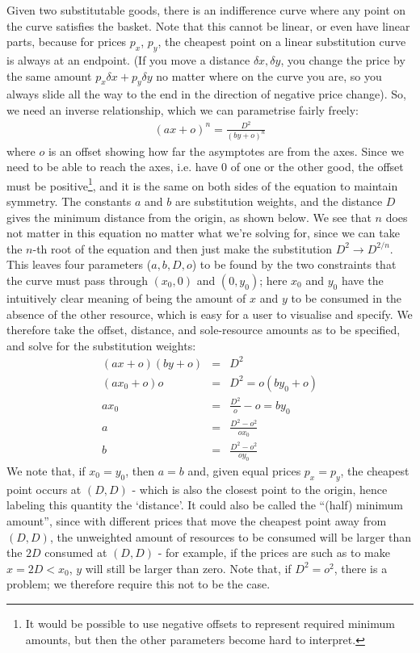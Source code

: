 \documentclass[12pt]{book}
\begin{document}
Given two substitutable goods, there is an indifference curve where
any point on the curve satisfies the basket. Note that this cannot be
linear, or even have linear parts, because for prices $p_x$, $p_y$,
the cheapest point on a linear substitution curve is always at an
endpoint. (If you move a distance $\delta x, \delta y$, you change the
price by the same amount $p_x\delta x + p_y \delta y$ no matter where
on the curve you are, so you always slide all the way to the end in
the direction of negative price change). So, we need an inverse
relationship, which we can parametrise fairly freely:
\begin{eqnarray}
(ax + o)^n = \frac{D^2}{(by + o)^n}
\end{eqnarray}
where $o$ is an offset showing how far the asymptotes are from the
axes. Since we need to be able to reach the axes, i.e. have 0 of one
or the other good, the offset must be positive\footnote{It would be
  possible to use negative offsets to represent required minimum
  amounts, but then the other parameters become hard to interpret.}, and it is the same on
both sides of the equation to maintain symmetry. The constants $a$ and
$b$ are substitution weights, and the distance $D$ gives the minimum
distance from the origin, as shown below. We see that $n$ does not
matter in this equation no matter what we're solving for, since we can take the
$n$-th root of the equation and then just make the substitution
$D^2\to D^{2/n}$. This leaves four parameters ($a,b,D,o$) to be found
by the two constraints that the curve must pass through $(x_0,0)$ and
$(0, y_0)$; here $x_0$ and $y_0$ have the intuitively clear meaning of
being the amount of $x$ and $y$ to be consumed in the absence of the
other resource, which is easy for a user to visualise and specify.
We therefore take the offset, distance, and sole-resource amounts as
to be specified, and solve for the substitution weights:
\begin{eqnarray*}
(ax + o)(by + o) &=& D^2\\
(ax_0 + o)o &=& D^2 = o(by_0 + o)\\
ax_0 &=& \frac{D^2}{o} - o = by_0\\
a &=& \frac{D^2 - o^2}{ox_0}\\
b &=& \frac{D^2 - o^2}{oy_0}
\end{eqnarray*}
We note that, if $x_0=y_0$, then $a=b$ and, given equal prices
$p_x=p_y$, the cheapest point occurs at $(D, D)$ - which is also the
closest point to the origin, hence labeling this quantity the
`distance'. It could also be called the ``(half) minimum amount'', since with
different prices that move the cheapest point away from $(D, D)$, the
unweighted amount of resources to be consumed will be larger than the
$2D$ consumed at $(D, D)$ - for example, if the prices are such as to
make $x=2D<x_0$, $y$ will still be larger than zero. Note that, if
$D^2=o^2$, there is a problem; we therefore require this not to be the
case.
\end{document}
